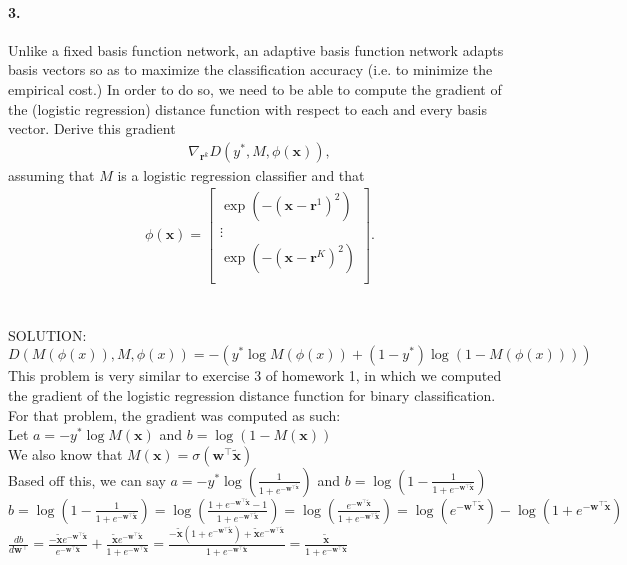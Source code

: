 \documentclass{article}
\newcommand{\vect}[1]{\mathbf{#1}}
\newcommand{\vx}[0]{\vect{x}}
\newcommand{\vw}[0]{\vect{w}}
\newcommand{\vr}[0]{\vect{r}}
\newcommand{\sigmoid}{\sigma}
\begin{document}
\paragraph{3.} 

Unlike a fixed basis function network, an adaptive basis function network adapts
basis vectors so as to maximize the classification accuracy (i.e. to minimize
the empirical cost.) In order to do so, we need to be able to compute the
gradient of the (logistic regression) distance function with respect to each and
every basis vector. Derive this gradient 
\begin{align*}
    \nabla_{\vr^k} D(y^*, M, \phi(\vx)),
\end{align*}
assuming that $M$ is a logistic regression classifier and that
\begin{align*}
    \phi(\vx) = \left[ 
        \begin{array}{c}
            \exp\left( -(\vx - \vr^1)^2 \right)  \\
            \vdots \\
            \exp\left( -(\vx - \vr^K)^2 \right)  \\
        \end{array}
    \right].
\end{align*}
\\
\\
SOLUTION: \\ 
$D(M(\phi(x)),M,\phi(x)) = -(y^*\log M(\phi(x))+(1-y^*)\log(1-M(\phi(x))))$ \\
This problem is very similar to exercise 3 of homework 1, in which we computed the gradient of the logistic regression distance function for binary classification. For that problem, the gradient was computed as such: \\ 
Let $a = -y^* \log M(\vx)$ and $b =  \log (1- M(\vx))$ \\
We also know that $M(\vx) = \sigmoid(\vw^\top \tilde{\vx}) $ \\
Based off this, we can say $a = -y^* \log ( \frac{1}{1+e^{-\vw^{\top \tilde{\vx}}}})$ and $b =  \log (1- \frac{1}{1+e^{-\vw^\top \tilde{\vx}}})$ \\
$b = \log (1- \frac{1}{1+e^{-\vw^\top \tilde{\vx}}}) = \log ( \frac{1+e^{-\vw^\top \tilde{\vx} } - 1}{1+e^{-\vw^\top \tilde{\vx}}}) = \log ( \frac{e^{-\vw^\top \tilde{\vx} }}{1+e^{-\vw^\top \tilde{\vx}}}) =  \log ( e^{-\vw^\top \tilde{\vx} } ) - \log (1+e^{-\vw^\top \tilde{\vx}}) $ \\
$ \frac{db}{d \vw^\top} = \frac{-\tilde{\vx} e^{-\vw^\top \tilde{\vx}}}{e^{-\vw^\top \tilde{\vx}}} + \frac{\tilde{\vx} e^{-\vw^\top \tilde{\vx}}}{1 + e^{-\vw^\top \tilde{\vx}}}  = \frac{-\tilde{\vx} (1 + e^{-\vw^\top \tilde{\vx}}) +\tilde{\vx} e^{-\vw^\top \tilde{\vx}}}{1 + e^{-\vw^\top \tilde{\vx}}}  = \frac{\tilde{\vx}}{1 + e^{-\vw^\top \tilde{\vx}}}$ \\
\end{document}
